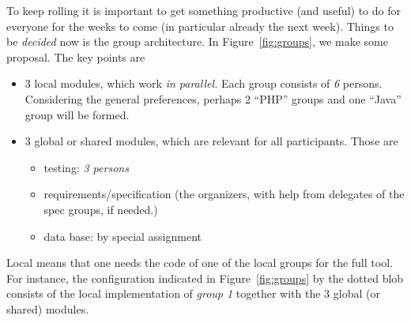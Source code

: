 \documentclass[11pt,handout,nologo]{handout}
\begin{document}
To keep rolling it is important to get something productive (and useful) to
do for everyone for the weeks to come (in particular already the next
week). Things to be \emph{decided} now is the group architecture. In
Figure~\ref{fig:groups}, we make some proposal. The key points are

\begin{itemize}
\item 3 local modules, which work \emph{in parallel.}  Each group consists
  of \emph{6} persons. Considering the general preferences, perhaps 2
  ``PHP'' groups and one ``Java'' group will be formed.
\item 3 global or shared modules, which are relevant for all participants.
  Those are
  \begin{itemize}
  \item testing: \emph{3 persons}
  \item requirements/specification (the organizers, with help from
    delegates of the spec groups, if needed.)
  \item data base: by special assignment
  \end{itemize}
\end{itemize}


Local means that one needs the code of one of the local groups for the full
tool. For instance, the configuration indicated in Figure~\ref{fig:groups}
by the dotted blob consists of the local implementation of \emph{group 1}
together with the 3 global (or shared) modules.

\medskip
\end{document}
